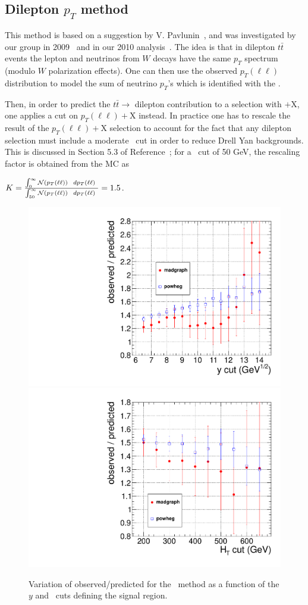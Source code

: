 \subsection{Dilepton $p_T$ method}
\label{sec:victory}
This method is based on a suggestion by V. Pavlunin~\cite{ref:victory},
and was investigated by our group in 2009~\cite{ref:ourvictory} and
in our 2010 analysis~\cite{ref:ospaper}.
The idea is that in dilepton $t\bar{t}$ events the lepton and neutrinos
from $W$ decays have the same $p_T$ spectrum (modulo $W$ polarization 
effects).  One can then use the observed 
$p_T(\ell\ell)$ distribution to model the sum of neutrino $p_T$'s which 
is identified with the \met.

Then, in order to predict the $t\bar{t} \to$ dilepton contribution to a 
selection with \met$+$X, one applies a cut on $p_T(\ell\ell)+$X instead.
In practice one has to rescale the result of the $p_T(\ell\ell)+$X selection
to account for the fact that any dilepton selection must include a 
moderate \met\ cut in order to reduce Drell Yan backgrounds.  This 
is discussed in Section 5.3 of Reference~\cite{ref:ourvictory}; for a \met\
cut of 50 GeV, the rescaling factor is obtained from the MC as

\begin{center}
$ K = \frac{\int_0^{\infty} {\cal N}(p_T(\ell\ell))~~dp_T(\ell\ell)~}{\int_{50}^{\infty} {\cal N}(p_T(\ell\ell))~~dp_T(\ell\ell)~} = 1.5$.
\end{center}

\begin{figure}[hbt]
\begin{center}
\includegraphics[width=0.48\linewidth]{plots/victory_yvary.pdf}
\includegraphics[width=0.48\linewidth]{plots/victory_htvary.pdf}
\caption{\label{fig:victory}\protect Variation of observed/predicted
for the \ptll\ method as a function of the $y$ and \Ht\ cuts defining
the signal region.}
\end{center}
\end{figure}

